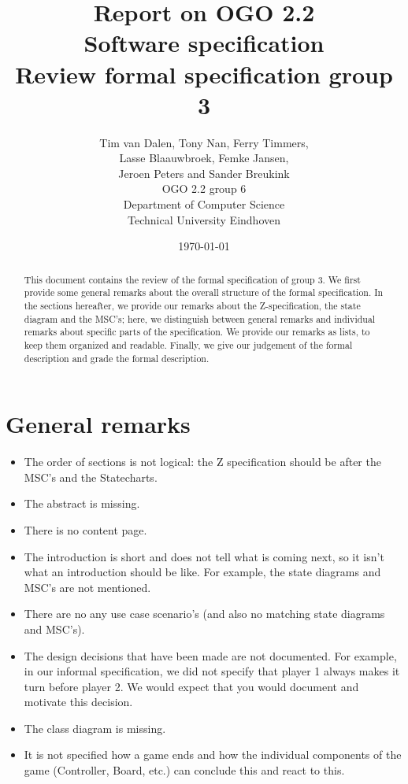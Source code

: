 \documentclass[a4paper,11pt]{article}
\title{Report on OGO 2.2 \\ Software specification\\ Review formal specification group 3}
\author{
        Tim van Dalen, Tony Nan, Ferry Timmers, \\ Lasse Blaauwbroek, Femke Jansen, \\Jeroen Peters and Sander Breukink\\ OGO 2.2 group 6 \\
                Department of Computer Science\\
        Technical University Eindhoven\\
}
\date{\today}
\begin{document}
\maketitle

\begin{abstract}
This document contains the review of the formal specification of group 3. We first provide some general remarks about the overall structure of the formal specification. In the sections hereafter, we provide our remarks about the Z-specification, the state diagram and the MSC's; here, we distinguish between general remarks and individual remarks about specific parts of the specification. We provide our remarks as lists, to keep them organized and readable. Finally, we give our judgement of the formal description and grade the formal description.
\end{abstract}

\newpage
	
	\tableofcontents
	\newpage
	
	\section{General remarks}
    \begin{itemize}
        \item The order of sections is not logical: the Z specification should be after the MSC's and the Statecharts.
        \item The abstract is missing.
        \item There is no content page.
        \item The introduction is short and does not tell what is coming next, so it isn't what an introduction should be like. For example, the state diagrams and MSC's are not mentioned.
        \item There are no any use case scenario's (and also no matching state diagrams and MSC's).
        \item The design decisions that have been made are not documented. For example, in our informal specification, we did not specify that player 1 always makes it turn before player 2. We would expect that you would document and motivate this decision.
        \item The class diagram is missing.
        \item It is not specified how a game ends and how the individual components of the game (Controller, Board, etc.) can conclude this and react to this.
    \end{itemize}
	
\end{document}
